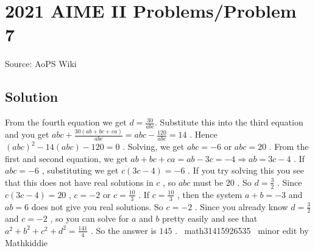 \documentclass[12pt]{article}
\begin{document}
\section*{{2021 AIME II Problems/Problem 7}}
Source: AoPS Wiki

\subsection*{Solution}
From the fourth equation we get $d=\frac{30}{abc}.$ Substitute this into the third equation and you get $abc + \frac{30(ab + bc + ca)}{abc} = abc - \frac{120}{abc} = 14$ . Hence $(abc)^2 - 14(abc)-120 = 0$ . Solving, we get $abc = -6$ or $abc = 20$ . From the first and second equation, we get $ab + bc + ca = ab-3c = -4 \Longrightarrow ab = 3c-4$ . If $abc=-6$ , substituting we get $c(3c-4)=-6$ . If you try solving this you see that this does not have real solutions in $c$ , so $abc$ must be $20$ . So $d=\frac{3}{2}$ . Since $c(3c-4)=20$ , $c=-2$ or $c=\frac{10}{3}$ . If $c=\frac{10}{3}$ , then the system $a+b=-3$ and $ab = 6$ does not give you real solutions. So $c=-2$ . Since you already know $d=\frac{3}{2}$ and $c=-2$ , so you can solve for $a$ and $b$ pretty easily and see that $a^{2}+b^{2}+c^{2}+d^{2}=\frac{141}{4}$ . So the answer is $\boxed{145}$ . ~math31415926535 ~minor edit by Mathkiddie
\end{document}
